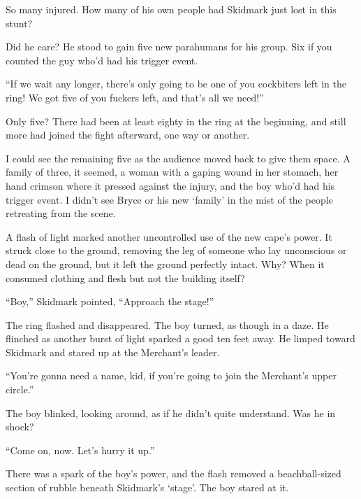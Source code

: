 So many injured.  How many of his own people had Skidmark just lost in this stunt?



Did he care?  He stood to gain five new parahumans for his group.  Six if you counted the guy who'd had his trigger event.



``If we wait any longer, there's only going to be one of you cockbiters left in the ring!  We got five of you fuckers left, and that's all we need!''



Only five?  There had been at least eighty in the ring at the beginning, and still more had joined the fight afterward, one way or another.



I could see the remaining five as the audience moved back to give them space.  A family of three, it seemed, a woman with a gaping wound in her stomach, her hand crimson where it pressed against the injury, and the boy who'd had his trigger event.  I didn't see Bryce or his new `family' in the mist of the people retreating from the scene.



A flash of light marked another uncontrolled use of the new cape's power.  It struck close to the ground, removing the leg of someone who lay unconscious or dead on the ground, but it left the ground perfectly intact.  Why?  When it consumed clothing and flesh but not the building itself?



``Boy,'' Skidmark pointed, ``Approach the stage!''



The ring flashed and disappeared.  The boy turned, as though in a daze.  He flinched as another burst of light sparked a good ten feet away.  He limped toward Skidmark and stared up at the Merchant's leader.



``You're gonna need a name, kid, if you're going to join the Merchant's upper circle.''



The boy blinked, looking around, as if he didn't quite understand.  Was he in shock?



``Come on, now.  Let's hurry it up.''



There was a spark of the boy's power, and the flash removed a beachball-sized section of rubble beneath Skidmark's `stage'.  The boy stared at it.



